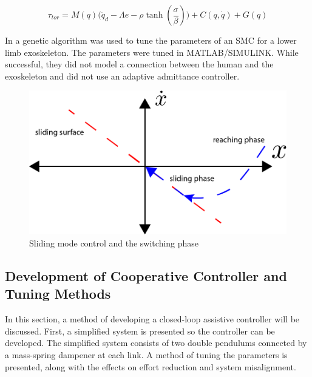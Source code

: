 \begin{equation}
        \tau_{tor} = M(q) \Big( \ddot{q}_d  - \Lambda e - \rho \tanh(\frac{\sigma}{\beta}) \Big) + C( q, \dot{q} ) + G(q) 
    \label{eq:SMCcnrl}
\end{equation}






In \cite{long2016robust} a genetic algorithm was used to tune the parameters of an SMC for a lower limb exoskeleton. The parameters were tuned in MATLAB/SIMULINK. While successful, they did not model a connection between the human and the exoskeleton and did not use an adaptive admittance controller. 

\begin{figure}
    \centering
    \includegraphics[width=\linewidth]{images/controllers/SMC.png}
    \caption{Sliding mode control and the switching phase}
    \label{fig:SMC}
\end{figure}

\subsection{Development of Cooperative Controller and Tuning Methods}

In this section, a method of developing a closed-loop assistive controller will be discussed. First, a simplified system is presented so the controller can be developed. The simplified system consists of two double pendulums connected by a mass-spring dampener at each link. A method of tuning the parameters is presented, along with the effects on effort reduction and system misalignment.

